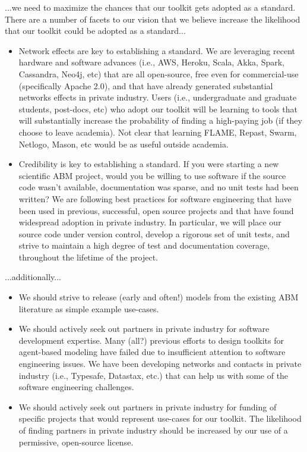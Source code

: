 \documentclass[11pt]{amsart}
\begin{document}
...we need to maximize the chances that our toolkit gets adopted as a standard. There are a number of facets to our vision that we believe increase the likelihood that our toolkit could be adopted as a standard...
\begin{itemize}
    \item Network effects are key to establishing a standard. We are leveraging recent hardware and software advances (i.e., AWS, Heroku, Scala, Akka, Spark, Cassandra, Neo4j, etc) that are all open-source, free even for commercial-use (specifically Apache 2.0), and that have already generated substantial networks effects in private industry. Users (i.e., undergraduate and graduate students, post-docs, etc) who adopt our toolkit will be learning to tools that will substantially increase the probability of finding a high-paying job (if they choose to leave academia).  Not clear that learning FLAME, Repast, Swarm, Netlogo, Mason, etc would be as useful outside academia. 
    \item Credibility is key to establishing a standard. If you were starting a new scientific ABM project, would you be willing to use software if the source code wasn't available, documentation was sparse, and no unit tests had been written? We are following best practices for software engineering that have been used in previous, successful, open source projects and that have found widespread adoption in private industry. In particular, we will place our source code under version control, develop a rigorous set of unit tests, and strive to maintain a high degree of test and documentation coverage, throughout the lifetime of the project.
\end{itemize}
...additionally...
\begin{itemize}
    \item We should strive to release (early and often!) models from the existing ABM literature as simple example use-cases.    
    \item We should actively seek out partners in private industry for software development expertise.  Many (all?) previous efforts to design toolkits for agent-based modeling have failed due to insufficient attention to software engineering issues. We have been developing networks and contacts in private industry (i.e., Typesafe, Datastax, etc.) that can help us with some of the software engineering challenges. 
    \item We should actively seek out partners in private industry for funding of specific projects that would represent use-cases for our toolkit. The likelihood of finding partners in private industry should be increased by our use of a permissive, open-source license.
\end{itemize}    
\end{document}
